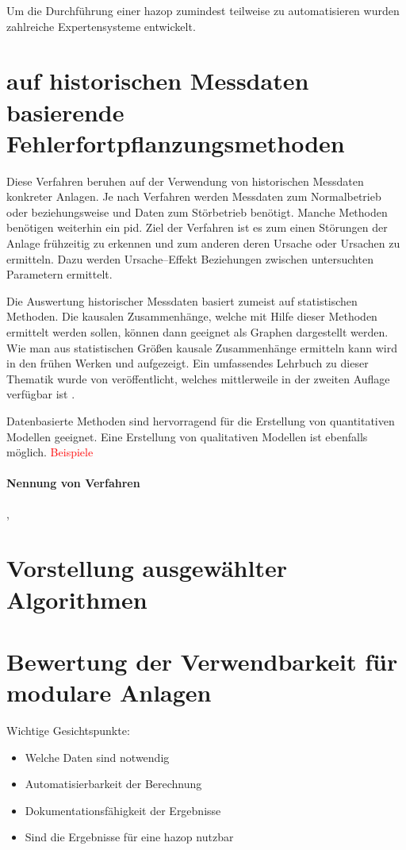 Um die Durchf\"uhrung einer \ac{hazop} zumindest teilweise zu automatisieren wurden zahlreiche Expertensysteme entwickelt. 

\section{auf historischen Messdaten basierende Fehlerfortpflanzungsmethoden}\label{sec:fAna_dat}
Diese Verfahren beruhen auf der Verwendung von historischen Messdaten konkreter Anlagen. Je nach Verfahren werden Messdaten zum Normalbetrieb oder beziehungsweise und Daten zum St\"orbetrieb ben\"otigt. Manche Methoden ben\"otigen weiterhin ein \ac{pid}. Ziel der Verfahren ist es zum einen St\"orungen der Anlage fr\"uhzeitig zu erkennen und zum anderen deren Ursache oder Ursachen zu ermitteln. Dazu werden Ursache--Effekt Beziehungen zwischen untersuchten Parametern ermittelt.  

Die Auswertung historischer Messdaten basiert zumeist auf statistischen Methoden. Die kausalen Zusammenh\"ange, welche mit Hilfe dieser Methoden ermittelt werden sollen, k\"onnen dann geeignet als Graphen dargestellt werden. Wie man aus statistischen Gr\"o\ss{}en kausale Zusammenh\"ange ermitteln kann wird in den fr\"uhen Werken \textcite{Holland_1986} und  \textcite{Pearl_1995} aufgezeigt. Ein umfassendes Lehrbuch zu dieser Thematik wurde von \citeauthor{Pearl_2009} ver\"offentlicht, welches mittlerweile in der zweiten Auflage verf\"ugbar ist \cite{Pearl_2009}.

Datenbasierte Methoden sind hervorragend f\"ur die Erstellung von quantitativen Modellen geeignet. Eine Erstellung von qualitativen Modellen ist ebenfalls m\"oglich. \textcolor{red}{Beispiele}
\paragraph*{Nennung von Verfahren}
\cite{Zhang_2017}, \cite{Thornhill_2006}



\section{Vorstellung ausgew\"ahlter Algorithmen}
\section{Bewertung der Verwendbarkeit f\"ur modulare Anlagen}
Wichtige Gesichtspunkte:
\begin{itemize}
\item Welche Daten sind notwendig
\item Automatisierbarkeit der Berechnung
\item Dokumentationsf\"ahigkeit der Ergebnisse
\item Sind die Ergebnisse f\"ur eine \ac{hazop} nutzbar
\end{itemize}